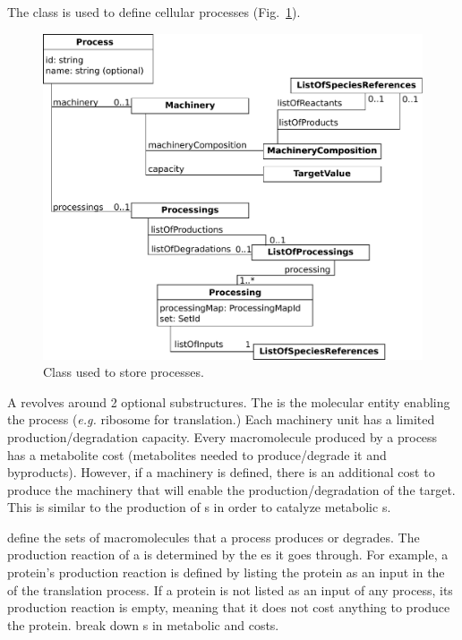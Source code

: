 The \process{} class is used to define cellular processes
(Fig.~\ref{fig:processes_process}).

\begin{figure}
  \centering
  \includegraphics[scale=0.8]{figures/processes_process}
  \caption{Class used to store processes.}
\label{fig:processes_process}
\end{figure}

A \process{} revolves around 2 optional substructures.
The \machinery{} is the molecular entity enabling the process
(\textit{e.g.} ribosome for translation.)
Each machinery unit has a limited production/degradation capacity.
Every macromolecule produced by a process has a metabolite cost
(metabolites needed to produce/degrade it and byproducts).
However, if a machinery is defined, there is an additional cost
to produce the machinery that will enable the production/degradation of the
target.
This is similar to the production of \enzyme{}s in order to catalyze
metabolic \reaction{}s.

\processings{} define the sets of macromolecules that a process
produces or degrades.
The production reaction of a \macromolecule{} is determined by the \process{}es
it goes through.
For example, a protein's production reaction is defined by listing
the protein as an input in the \processings{} of the translation process.
If a protein is not listed as an input of any process, its production reaction
is empty, meaning that it does not cost anything to produce the protein.
\processings{} break down \macromolecule{}s in metabolic \species{}
and \machinery{} costs.

